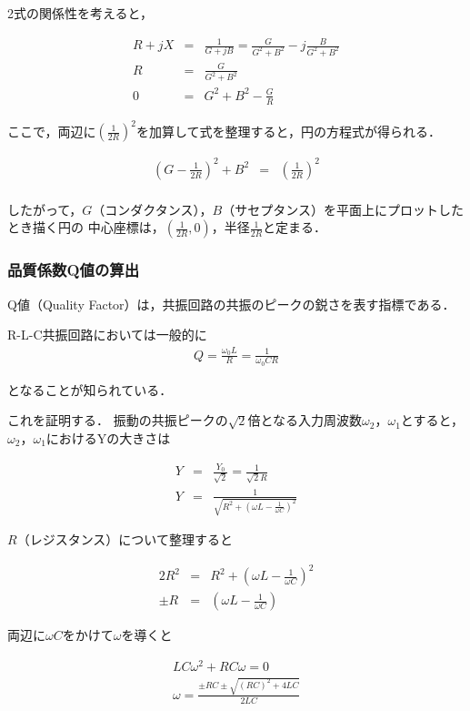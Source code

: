 \documentclass[dvipdfmx,titlepage,a4j]{jsarticle}  %
\numberwithin{equation}{section}
\begin{document}
2式の関係性を考えると，

\begin{eqnarray}
  R + jX &=& \frac{1}{G + jB} = \frac{G}{G^2 + B^2} -j\frac{B}{G^2 + B^2} \\
  R &=& \frac{G}{G^2 + B^2} \\
  0 &=& G^2 + B^2 - \frac{G}{R}
\end{eqnarray}

ここで，両辺に$(\frac{1}{2R})^2$を加算して式を整理すると，円の方程式が得られる．

\begin{eqnarray}
  (G - \frac{1}{2R})^2 + B^2 &=& (\frac{1}{2R})^2 \\
\end{eqnarray}

したがって，$G$（コンダクタンス），$B$（サセプタンス）を平面上にプロットしたとき描く円の
中心座標は，$(\frac{1}{2R}, 0)$，半径$\frac{1}{2R}$と定まる．

\subsubsection{品質係数Q値の算出}
Q値（Quality Factor）は，共振回路の共振のピークの鋭さを表す指標である．

R-L-C共振回路においては一般的に
\begin{eqnarray}
  Q = \frac{\omega_0 L}{R} = \frac{1}{\omega_0 CR}
\end{eqnarray}

となることが知られている．

これを証明する．
振動の共振ピークの$\sqrt{2}$倍となる入力周波数$\omega_2$，$\omega_1$とすると，
$\omega_2$，$\omega_1$におけるYの大きさは

\begin{eqnarray}
  Y &=& \frac{Y_0}{\sqrt{2}} = \frac{1}{\sqrt{2}R} \\
  Y &=& \frac{1}{\sqrt{R^2 + (\omega L - \frac{1}{\omega C})^2}}
\end{eqnarray}

$R$（レジスタンス）について整理すると

\begin{eqnarray}
  2R^2 &=& R^2 + (\omega L - \frac{1}{\omega C})^2 \\
  \pm R &=& (\omega L - \frac{1}{\omega C})
\end{eqnarray}

両辺に$\omega C$をかけて$\omega$を導くと

\begin{eqnarray}
  LC \omega^2 + RC\omega = 0\\
  \omega = \frac{\pm RC \pm \sqrt{(RC)^2 + 4LC}}{2LC}
\end{eqnarray}
\end{document}
